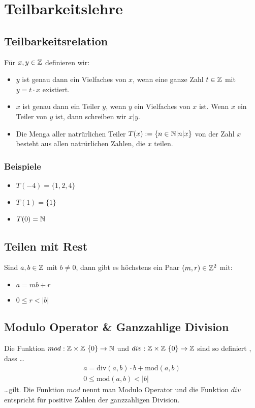 \section{Teilbarkeitslehre}
\subsection{Teilbarkeitsrelation}
Für $x,y \in \mathbb{Z}$ definieren wir:
\begin{itemize}
	\item $y$ ist genau dann ein Vielfaches von $x$, wenn eine ganze Zahl $t \in \mathbb{Z}$
	      mit $y = t \cdot x$ existiert.
	\item $x$ ist genau dann ein Teiler $y$, wenn $y$ ein Vielfaches von $x$ ist.
	      Wenn $x$ ein Teiler von $y$ ist, dann schreiben wir $x|y$.
	\item Die Menga aller natrürlichen Teiler $T(x) := \{n \in \mathbb{N} | n|x\}$ von der Zahl $x$ besteht
	      aus allen natrürlichen Zahlen, die $x$ teilen.
\end{itemize}
\subsubsection{Beispiele}
\begin{itemize}
	\item $T(-4) = \{1,2,4\}$
	\item $T(1) = \{1\}$
	\item $T(0) = \mathbb{N}$
\end{itemize}
\subsection{Teilen mit Rest}
Sind $a,b \in \mathbb{Z}$ mit $b \neq 0$, dann gibt es höchstens ein Paar $(m,r) \in \mathbb{Z}^2$ mit:
\begin{itemize}
	\item $a = mb + r$
	\item $0 \leq r < |b|$
\end{itemize}
\subsection{Modulo Operator \& Ganzzahlige Division}
Die Funktion $mod : \mathbb{Z} \times \mathbb{Z} \ \{0\} \to \mathbb{N}$ und $div: \mathbb{Z} \times \mathbb{Z} \ \{0\} \to \mathbb{Z}$ sind so definiert
, dass \dots
\begin{align*}
	a = \text{div}(a,b) \cdot b + \text{mod}(a,b) \\
	0 \leq \text{mod}(a,b) < |b|
\end{align*}
\dots gilt. Die Funktion $mod$ nennt man Modulo Operator und die Funktion $div$ entspricht für  positive
Zahlen der ganzzahligen Division.
